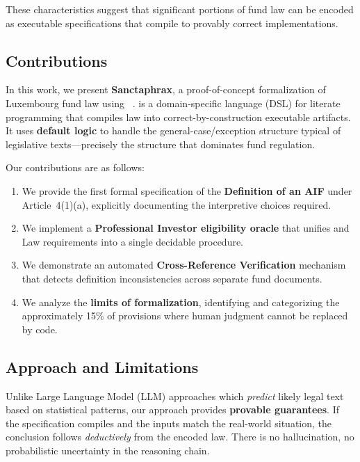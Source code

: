 These characteristics suggest that significant portions of fund law can be encoded as executable specifications that compile to provably correct implementations.

\subsection{Contributions}

In this work, we present \textbf{Sanctaphrax}, a proof-of-concept formalization of Luxembourg fund law using \textbf{\catala{}}~\cite{merigoux2021catala}. \catala{} is a domain-specific language (DSL) for literate programming that compiles law into correct-by-construction executable artifacts. It uses \textbf{default logic} to handle the general-case/exception structure typical of legislative texts---precisely the structure that dominates fund regulation.

Our contributions are as follows:

\begin{enumerate}[nosep,leftmargin=1.5em]
  \item We provide the first formal specification of the \textbf{Definition of an AIF} under \aifmd{} Article~4(1)(a), explicitly documenting the interpretive choices required.

  \item We implement a \textbf{Professional Investor eligibility oracle} that unifies \mifid{} and \raif{} Law requirements into a single decidable procedure.

  \item We demonstrate an automated \textbf{Cross-Reference Verification} mechanism that detects definition inconsistencies across separate fund documents.

  \item We analyze the \textbf{limits of formalization}, identifying and categorizing the approximately 15\% of provisions where human judgment cannot be replaced by code.
\end{enumerate}

\subsection{Approach and Limitations}

Unlike Large Language Model (LLM) approaches which \textit{predict} likely legal text based on statistical patterns, our approach provides \textbf{provable guarantees}. If the specification compiles and the inputs match the real-world situation, the conclusion follows \textit{deductively} from the encoded law. There is no hallucination, no probabilistic uncertainty in the reasoning chain.

